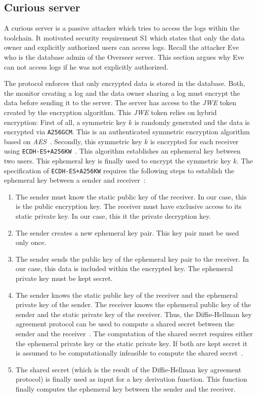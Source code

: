 \documentclass[../main.tex]{subfiles}
\begin{document}
\subsection{Curious server}
A curious server is a passive attacker which tries to access the logs within the toolchain.
It motivated security requirement S1 which states that only the data owner and explicitly authorized users can access logs.
Recall the attacker Eve who is the database admin of the Overseer server.
This section argues why Eve can not access logs if he was not explicitly authorized.

The protocol enforces that only encrypted data is stored in the database.
Both, the monitor creating a log and the data owner sharing a log must encrypt the data before sending it to the server.
The server has access to the \emph{JWE} token created by the encryption algorithm.
This \emph{JWE} token relies on hybrid encryption:
First of all, a symmetric key $k$ is randomly generated and the data is encrypted via \verb|A256GCM|.
This is an authenticated symmetric encryption algorithm based on \emph{AES}~\cite{Jones2015}.
Secondly, this symmetric key $k$ is encrypted for each receiver using \verb|ECDH-ES+A256KW|~\cite{Jones2015}.
This algorithm establishes an ephemeral key between two users.
This ephemeral key is finally used to encrypt the symmetric key $k$.
The specification of \verb|ECDH-ES+A256KW| requires the following steps to establish the ephemeral key between a sender and receiver~\cite[100]{Barker2017}:
\begin{enumerate}
    \item 
    The sender must know the static public key of the receiver. 
    In our case, this is the public encryption key.
    The receiver must have exclusive access to its static private key.
    In our case, this it the private decryption key.
    \item 
    The sender creates a new ephemeral key pair. 
    This key pair must be used only once.
    \item 
    The sender sends the public key of the ephemeral key pair to the receiver.
    In our case, this data is included within the encrypted key.
    The ephemeral private key must be kept secret.
    \item 
    The sender knows the static public key of the receiver and the ephemeral private key of the sender.
    The receiver knows the ephemeral public key of the sender and the static private key of the receiver.
    Thus, the Diffie-Hellman key agreement protocol can be used to compute a shared secret between the sender and the receiver~\cite[section 9.3.6]{Eckert2018}.
    The computation of the shared secret requires either the ephemeral private key or the static private key.
    If both are kept secret it is assumed to be computationally infeasible to compute the shared secret~\cite[section 9.3.6]{Eckert2018}.
    \item 
    The shared secret (which is the result of the Diffie-Hellman key agreement protocol) is finally used as input for a key derivation function.
    This function finally computes the ephemeral key between the sender and the receiver.
\end{enumerate}
\end{document}
